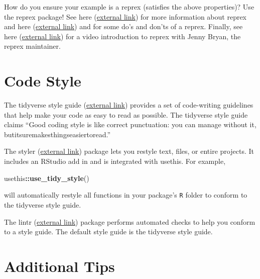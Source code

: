\documentclass[
]{book}
\newenvironment{Shaded}{\begin{snugshade}}{\end{snugshade}}
\newcommand{\KeywordTok}[1]{\textcolor[rgb]{0.13,0.29,0.53}{\textbf{#1}}}
\newcommand{\NormalTok}[1]{#1}
\newcommand{\OperatorTok}[1]{\textcolor[rgb]{0.81,0.36,0.00}{\textbf{#1}}}
\begin{document}
How do you ensure your example is a reprex (satisfies the above properties)? Use the reprex package! See here (\href{https://reprex.tidyverse.org/}{external link}) for more information about reprex and here (\href{https://cran.r-project.org/web/packages/reprex/vignettes/reprex-dos-and-donts.html}{external link}) and for some do's and don'ts of a reprex. Finally, see here (\href{https://www.youtube.com/watch?v=5gqksthQ0cM}{external link}) for a video introduction to reprex with Jenny Bryan, the reprex maintainer.

\hypertarget{style}{%
\section{Code Style}\label{style}}

The tidyverse style guide (\href{https://style.tidyverse.org/}{external link}) provides a set of code-writing guidelines that help make your code as easy to read as possible. The tidyverse style guide claims ``Good coding style is like correct punctuation: you can manage without it, butitsuremakesthingseasiertoread.''

The styler (\href{https://styler.r-lib.org/}{external link}) package lets you restyle text, files, or entire projects. It includes an RStudio add in and is integrated with usethis. For example,

\begin{Shaded}
\begin{Highlighting}[]
\NormalTok{usethis}\OperatorTok{::}\KeywordTok{use_tidy_style}\NormalTok{()}
\end{Highlighting}
\end{Shaded}

will automatically restyle all functions in your package's \texttt{R} folder to conform to the tidyverse style guide.

The lintr (\href{https://github.com/jimhester/lintr}{external link}) package performs automated checks to help you conform to a style guide. The default style guide is the tidyverse style guide.

\hypertarget{add-tips}{%
\section{Additional Tips}\label{add-tips}}
\end{document}
